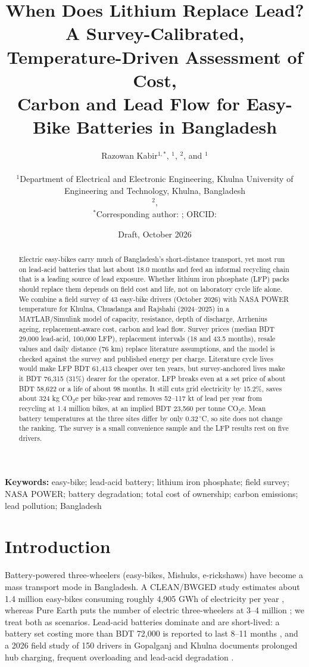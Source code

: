 \documentclass[11pt,a4paper]{article}
\title{%
When Does Lithium Replace Lead?\\
A Survey-Calibrated, Temperature-Driven Assessment of Cost,\\
Carbon and Lead Flow for Easy-Bike Batteries in Bangladesh%
}
\author{%
    Razowan Kabir$^{1,*}$,
    \todo{Md. Raju Mridha}$^{1}$,
    \todo{Meshkat Sorif}$^{2}$,
    and \todo{Md Atikur Rahman}$^{1}$%
    \\[6pt]
    \parbox{0.92\textwidth}{\centering\small
        $^{1}$Department of Electrical and Electronic Engineering,
        Khulna University of Engineering and Technology,
        Khulna, Bangladesh\\[2pt]
        $^{2}$\todo{Department of Electrical and Electronic Engineering, Gopalganj Science and Technology University},
        \todo{Gopalganj, Bangladesh}\\[2pt]
        $^{*}$Corresponding author:
        \todo{rkrazowan@gmail.com};
        ORCID: \todo{0009-0008-6274-8117}%
    }%
}
\date{Draft, October 2026}
\newcommand{\nSurvey}{43}
\newcommand{\costMedLA}{29{,}000}
\newcommand{\replMedLA}{18}
\newcommand{\costMedLFP}{100{,}000}
\newcommand{\replMedLFP}{43.5}
\newcommand{\kmAll}{76}
\newcommand{\lifeLA}{18.0}
\newcommand{\gapLFP}{76{,}315}
\newcommand{\gapPct}{31}
\newcommand{\gridratio}{15.2}
\newcommand{\Tspread}{0.32}
\newcommand{\litGap}{61{,}413}
\newcommand{\beP}{58{,}622}
\newcommand{\beL}{98}
\newcommand{\saveBike}{324}
\newcommand{\leadLow}{52}
\newcommand{\leadHigh}{117}
\newcommand{\abateCarbon}{23{,}560}
\begin{document}
\maketitle
\begin{abstract}
Electric easy-bikes carry much of Bangladesh's short-distance transport, yet most run on lead-acid batteries that last about \lifeLA{} months and feed an informal recycling chain that is a leading source of lead exposure. Whether lithium iron phosphate (LFP) packs should replace them depends on field cost and life, not on laboratory cycle life alone. We combine a field survey of \nSurvey{} easy-bike drivers (October 2026) with NASA POWER temperature for Khulna, Chuadanga and Rajshahi (2024--2025) in a MATLAB/Simulink model of capacity, resistance, depth of discharge, Arrhenius ageing, replacement-aware cost, carbon and lead flow. Survey prices (median BDT \costMedLA{} lead-acid, \costMedLFP{} LFP), replacement intervals (\replMedLA{} and \replMedLFP{} months), resale values and daily distance (\kmAll{} km) replace literature assumptions, and the model is checked against the survey and published energy per charge. Literature cycle lives would make LFP BDT \litGap{} cheaper over ten years, but survey-anchored lives make it BDT \gapLFP{} (\gapPct\%) dearer for the operator. LFP breaks even at a set price of about BDT \beP{} or a life of about \beL{} months. It still cuts grid electricity by \gridratio\%, saves about \saveBike{} kg CO$_2$e per bike-year and removes \leadLow--\leadHigh{} kt of lead per year from recycling at 1.4 million bikes, at an implied BDT \abateCarbon{} per tonne CO$_2$e. Mean battery temperatures at the three sites differ by only \Tspread\,$^\circ$C, so site does not change the ranking. The survey is a small convenience sample and the LFP results rest on five drivers.
\end{abstract}
\noindent\textbf{Keywords:} easy-bike; lead-acid battery; lithium iron phosphate; field survey; NASA POWER; battery degradation; total cost of ownership; carbon emissions; lead pollution; Bangladesh
\bigskip

\section{Introduction}
\label{sec:intro}
Battery-powered three-wheelers (easy-bikes, Mishuks, e-rickshaws) have become a mass transport mode in Bangladesh. A CLEAN/BWGED study estimates about 1.4 million easy-bikes consuming roughly 4{,}905 GWh of electricity per year \cite{clean2024}, whereas Pure Earth puts the number of electric three-wheelers at 3--4 million \cite{pureearth_smep}; we treat both as scenarios. Lead-acid batteries dominate \cite{mordor2026} and are short-lived: a battery set costing more than BDT 72{,}000 is reported to last 8--11 months \cite{fe2024}, and a 2026 field study of 150 drivers in Gopalganj and Khulna documents prolonged hub charging, frequent overloading and lead-acid degradation \cite{chowdhury2026}.
\end{document}
